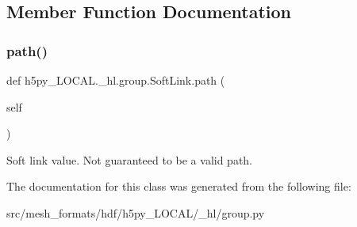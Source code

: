 \subsection{Member Function Documentation}
\mbox{\label{classh5py__LOCAL_1_1__hl_1_1group_1_1SoftLink_a76d49c628a868d4a1bae830ce43672b4}} 
\subsubsection{\texorpdfstring{path()}{path()}}
{\footnotesize\ttfamily def h5py\+\_\+\+L\+O\+C\+A\+L.\+\_\+hl.\+group.\+Soft\+Link.\+path (\begin{DoxyParamCaption}\item[{}]{self }\end{DoxyParamCaption})}

\begin{DoxyVerb}Soft link value.  Not guaranteed to be a valid path. \end{DoxyVerb}
 

The documentation for this class was generated from the following file\+:\begin{DoxyCompactItemize}
\item 
src/mesh\+\_\+formats/hdf/h5py\+\_\+\+L\+O\+C\+A\+L/\+\_\+hl/group.\+py\end{DoxyCompactItemize}
